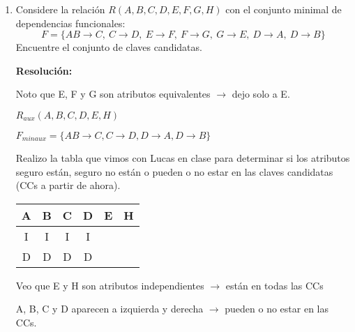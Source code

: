 \documentclass[a4paper,12pt]{article}
\begin{document}
\begin{enumerate}[label=\textbf{\arabic*.}]
    \item Considere la relación $R(A, B, C, D, E, F, G, H)$ con el conjunto minimal de dependencias funcionales:
    \[
        F = \{AB \rightarrow C,\ C \rightarrow D,\ E \rightarrow F,\ F \rightarrow G,\ G \rightarrow E,\ D \rightarrow A,\ D \rightarrow B\}
    \]
    Encuentre el conjunto de claves candidatas.

    \vspace{0.4cm}

    \textbf{Resolución:}
    
    Noto que E, F y G son atributos equivalentes $\rightarrow$ dejo solo a E.

    \vspace{0.2cm}

    $R_{aux}(A,B,C,D,E,H)$

    $F_{min aux} = \{AB \rightarrow C, C\rightarrow D, D \rightarrow A, D \rightarrow B\}$

    \vspace{0.2cm}

    Realizo la tabla que vimos con Lucas en clase para determinar si los atributos seguro están, seguro no están o pueden o no estar en las claves candidatas (CCs a partir de ahora).
    
    \vspace{0.1cm}

    \begin{center}
        \begin{tabular}{c|c|c|c|c|c}
             \textbf{A} & \textbf{B} & \textbf{C} & \textbf{D} & \textbf{E} & \textbf{H} \\
             \hline
             I & I & I & I &   &   \\
             D & D & D & D &   &   \\
        \end{tabular}
    \end{center}

    \vspace{0.1cm}

    Veo que E y H son atributos independientes $\rightarrow$ están en todas las CCs

    \vspace{0.1cm}

    A, B, C y D aparecen a izquierda y derecha $\rightarrow$ pueden o no estar en las CCs.

    \vspace{0.1cm}


\end{enumerate}
\end{document}
